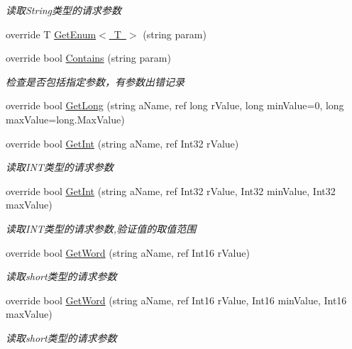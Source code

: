 \begin{DoxyCompactItemize}
\begin{DoxyCompactList}\small\item\em 读取\+String类型的请求参数 \end{DoxyCompactList}\item 
override T \mbox{\hyperlink{class_t_net_1_1_contract_1_1_http_get_aaf0d1200e3ae1fed4fafce2a029e0765}{Get\+Enum$<$ T $>$}} (string param)
\item 
override bool \mbox{\hyperlink{class_t_net_1_1_contract_1_1_http_get_a044f2a121dfb996b4edf9a1e46e3a8a9}{Contains}} (string param)
\begin{DoxyCompactList}\small\item\em 检查是否包括指定参数，有参数出错记录 \end{DoxyCompactList}\item 
override bool \mbox{\hyperlink{class_t_net_1_1_contract_1_1_http_get_ad32a67f657f1a0cb903ede041b76ae49}{Get\+Long}} (string a\+Name, ref long r\+Value, long min\+Value=0, long max\+Value=long.\+Max\+Value)
\item 
override bool \mbox{\hyperlink{class_t_net_1_1_contract_1_1_http_get_ab550a50c4f847e11b4f14bbdcc8b53cf}{Get\+Int}} (string a\+Name, ref Int32 r\+Value)
\begin{DoxyCompactList}\small\item\em 读取\+I\+N\+T类型的请求参数 \end{DoxyCompactList}\item 
override bool \mbox{\hyperlink{class_t_net_1_1_contract_1_1_http_get_a32e7dc20ec1a36fc86762d34c02dcadb}{Get\+Int}} (string a\+Name, ref Int32 r\+Value, Int32 min\+Value, Int32 max\+Value)
\begin{DoxyCompactList}\small\item\em 读取\+I\+N\+T类型的请求参数,验证值的取值范围 \end{DoxyCompactList}\item 
override bool \mbox{\hyperlink{class_t_net_1_1_contract_1_1_http_get_a6f010b795d8a3915c1a22671ea0d9cf4}{Get\+Word}} (string a\+Name, ref Int16 r\+Value)
\begin{DoxyCompactList}\small\item\em 读取short类型的请求参数 \end{DoxyCompactList}\item 
override bool \mbox{\hyperlink{class_t_net_1_1_contract_1_1_http_get_a5988342332c15e7ec67529c5cf63311a}{Get\+Word}} (string a\+Name, ref Int16 r\+Value, Int16 min\+Value, Int16 max\+Value)
\begin{DoxyCompactList}\small\item\em 读取short类型的请求参数 \end{DoxyCompactList}\item 

\end{DoxyCompactItemize}
